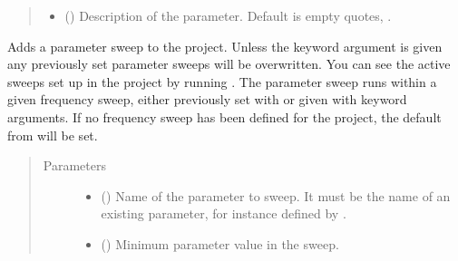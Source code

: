 \documentclass[letterpaper,10pt,english,openany]{sphinxmanual}
\begin{document}
\begin{fulllineitems}
\begin{fulllineitems}
\begin{quote}
\begin{description}
\begin{itemize}
\item {} 
 () \textendash{} Description of the parameter. Default is empty quotes, .

\end{itemize}

\end{description}\end{quote}

\end{fulllineitems}


\begin{fulllineitems}
\label{\detokenize{source/sonpy:sonpy.sonnet.addParameterSweep}}
Adds a parameter sweep to the project. Unless the keyword argument  is given any previously set parameter sweeps will be overwritten. You can see the active sweeps set up in the project by running {\hyperref[\detokenize{source/sonpy:sonpy.sonnet.printParameters}]{}}. The parameter sweep runs within a given frequency sweep, either previously set with {\hyperref[\detokenize{source/sonpy:sonpy.sonnet.setFrequencySweep}]{}} or given with keyword arguments. If no frequency sweep has been defined for the project, the default from {\hyperref[\detokenize{source/sonpy:sonpy.sonnet.setFrequencySweep}]{}} will be set.
\begin{quote}\begin{description}
\item[{Parameters}] \leavevmode\begin{itemize}
\item {} 
 () \textendash{} Name of the parameter to sweep. It must be the name of an existing parameter, for instance defined by {\hyperref[\detokenize{source/sonpy:sonpy.sonnet.addParameter}]{}}.

\item {} 
 () \textendash{} Minimum parameter value in the sweep.


\end{itemize}
\end{description}
\end{quote}
\end{fulllineitems}
\end{fulllineitems}
\end{document}
